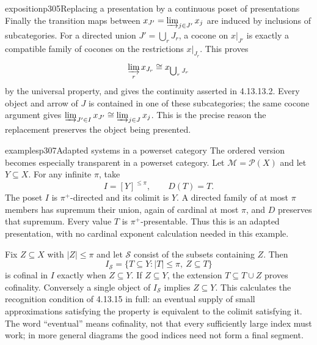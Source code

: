 \begin{dcomment}{exposition}{p305}{Replacing a presentation by a continuous poset of presentations}
Finally the transition maps between $x_{J'}=\varinjlim_{j\in J'}x_j$ are induced by inclusions of subcategories. For a directed union $J'=\bigcup_rJ_r$, a cocone on $x|_{J'}$ is exactly a compatible family of cocones on the restrictions $x|_{J_r}$. This proves
\[
 \varinjlim_r x_{J_r}\cong x_{\bigcup_rJ_r}
\]
by the universal property, and gives the continuity asserted in 4.13.13.2. Every object and arrow of $J$ is contained in one of these subcategories; the same cocone argument gives $\varinjlim_{J'\in I}x_{J'}\cong\varinjlim_{j\in J}x_j$. This is the precise reason the replacement preserves the object being presented.
\end{dcomment}

\begin{dcomment}{examples}{p307}{Adapted systems in a powerset category}
The ordered version becomes especially transparent in a powerset category. Let $\mathcal M=\mathcal P(X)$ and let $Y\subseteq X$. For any infinite $\pi$, take
\[
 I=[Y]^{\leq\pi},\qquad D(T)=T.
\]
The poset $I$ is $\pi^+$-directed and its colimit is $Y$. A directed family of at most $\pi$ members has supremum their union, again of cardinal at most $\pi$, and $D$ preserves that supremum. Every value $T$ is $\pi^+$-presentable. Thus this is an adapted presentation, with no cardinal exponent calculation needed in this example.

Fix $Z\subseteq X$ with $|Z|\leq\pi$ and let $\mathcal S$ consist of the subsets containing $Z$. Then
\[
 I_{\mathcal S}=\{T\subseteq Y:|T|\leq\pi,\ Z\subseteq T\}
\]
is cofinal in $I$ exactly when $Z\subseteq Y$. If $Z\subseteq Y$, the extension $T\subseteq T\cup Z$ proves cofinality. Conversely a single object of $I_{\mathcal S}$ implies $Z\subseteq Y$. This calculates the recognition condition of 4.13.15 in full: an eventual supply of small approximations satisfying the property is equivalent to the colimit satisfying it. The word ``eventual'' means cofinality, not that every sufficiently large index must work; in more general diagrams the good indices need not form a final segment.
\end{dcomment}

